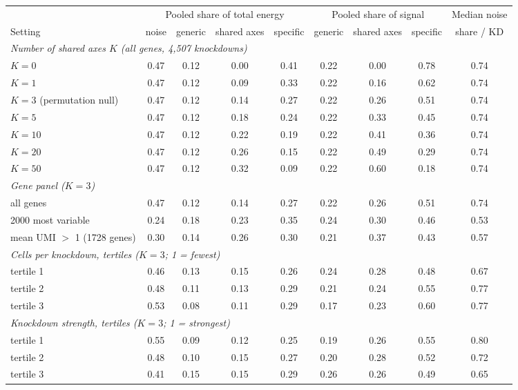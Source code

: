\begin{tabular}{lcccc|ccc|c}
\toprule
 & \multicolumn{4}{c|}{Pooled share of total energy} & \multicolumn{3}{c|}{Pooled share of signal} & Median noise \\
Setting & noise & generic & shared axes & specific & generic & shared axes & specific & share / KD \\
\midrule
\multicolumn{9}{l}{\emph{Number of shared axes $K$ (all genes, 4{,}507 knockdowns)}} \\
$K=0$ & 0.47 & 0.12 & 0.00 & 0.41 & 0.22 & 0.00 & 0.78 & 0.74 \\
$K=1$ & 0.47 & 0.12 & 0.09 & 0.33 & 0.22 & 0.16 & 0.62 & 0.74 \\
$K=3$ (permutation null) & 0.47 & 0.12 & 0.14 & 0.27 & 0.22 & 0.26 & 0.51 & 0.74 \\
$K=5$ & 0.47 & 0.12 & 0.18 & 0.24 & 0.22 & 0.33 & 0.45 & 0.74 \\
$K=10$ & 0.47 & 0.12 & 0.22 & 0.19 & 0.22 & 0.41 & 0.36 & 0.74 \\
$K=20$ & 0.47 & 0.12 & 0.26 & 0.15 & 0.22 & 0.49 & 0.29 & 0.74 \\
$K=50$ & 0.47 & 0.12 & 0.32 & 0.09 & 0.22 & 0.60 & 0.18 & 0.74 \\
\midrule\multicolumn{9}{l}{\emph{Gene panel ($K=3$)}} \\
all genes & 0.47 & 0.12 & 0.14 & 0.27 & 0.22 & 0.26 & 0.51 & 0.74 \\
2000 most variable & 0.24 & 0.18 & 0.23 & 0.35 & 0.24 & 0.30 & 0.46 & 0.53 \\
mean UMI $>$ 1 (1728 genes) & 0.30 & 0.14 & 0.26 & 0.30 & 0.21 & 0.37 & 0.43 & 0.57 \\
\midrule\multicolumn{9}{l}{\emph{Cells per knockdown, tertiles ($K=3$; 1 = fewest)}} \\
tertile 1 & 0.46 & 0.13 & 0.15 & 0.26 & 0.24 & 0.28 & 0.48 & 0.67 \\
tertile 2 & 0.48 & 0.11 & 0.13 & 0.29 & 0.21 & 0.24 & 0.55 & 0.77 \\
tertile 3 & 0.53 & 0.08 & 0.11 & 0.29 & 0.17 & 0.23 & 0.60 & 0.77 \\
\midrule\multicolumn{9}{l}{\emph{Knockdown strength, tertiles ($K=3$; 1 = strongest)}} \\
tertile 1 & 0.55 & 0.09 & 0.12 & 0.25 & 0.19 & 0.26 & 0.55 & 0.80 \\
tertile 2 & 0.48 & 0.10 & 0.15 & 0.27 & 0.20 & 0.28 & 0.52 & 0.72 \\
tertile 3 & 0.41 & 0.15 & 0.15 & 0.29 & 0.26 & 0.26 & 0.49 & 0.65 \\
\bottomrule
\end{tabular}